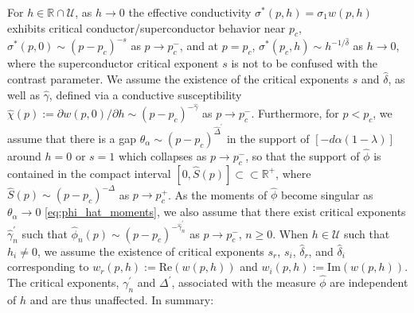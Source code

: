 \documentclass[jmp,graphicx]{revtex4-1}
\newcommand{\ph}{\hat{\phi}}
\newcommand{\gh}{\hat{\gamma}}
\newcommand{\Dh}{\hat{\Delta}}
\newcommand{\dha}{\hat{\delta}}
\begin{document}
For $h\in\mathbb{R}\cap\mathcal{U}$, as $h\to0$ the effective conductivity
$\sigma^*(p,h)=\sigma_1w(p,h)$ exhibits critical conductor/superconductor
behavior near $p_c$, $\sigma^*(p,0)\sim(p-p_c)^{-s}$ as $p\to p_c^-$, and at
$p=p_c$, $\sigma^*(p_c,h)\sim h^{-1/\dha}$ as $h\to0$, where the superconductor
critical exponent $s$ is not to be confused with the contrast
parameter. We assume the existence of the critical exponents $s$ and
$\dha$, as well as $\gh$, defined via a conductive susceptibility
$\hat{\chi}(p):=\partial w(p,0)/\partial h\sim(p-p_c)^{-\gh}$ as $p\to p_c^-$. Furthermore,
for $p<p_c$, we assume that there is a gap $\theta_\alpha\sim(p-p_c)^{\Dh^\prime}$ in the
support of $[-d\alpha(1-\lambda)]$ around $h=0$ or $s=1$ which collapses as
$p\to p_c^-$, so that the support of $\ph$ is contained in the compact
interval $[0,\hat{S}(p)]\subset\subset\mathbb{R}^+$, where
$\hat{S}(p)\sim(p-p_c)^{-\Delta}$ as $p\to p_c^+$. As the moments of $\ph$ become
singular as $\theta_\alpha\to0$ \eqref{eq:phi_hat_moments}, we also assume that
there exist critical exponents $\gh_n^\prime$ such that
$\ph_n(p)\sim(p-p_c)^{-\gh_n^\prime}$ as $p\to p_c^-$, $n\geq0$. When
$h\in\mathcal{U}$ such that $h_i\neq0$, we assume the existence of critical
exponents $s_r$, $s_i$, $\dha_r$, and $\dha_i$ corresponding to
$w_r(p,h):=\text{Re}(w(p,h))$ and $w_i(p,h):=\text{Im}(w(p,h))$. The
critical exponents, $\gamma_n^\prime$ and $\Delta^\prime$, associated with the measure
$\ph$ are independent of $h$ and are thus unaffected. In summary:
\end{document}
